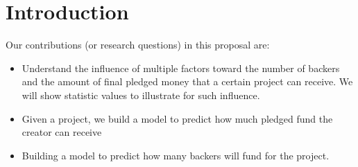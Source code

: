 \section{Introduction}
Our contributions (or research questions) in this proposal are:
\begin{itemize}
\item Understand the influence of multiple factors toward the number of backers and the amount of final pledged money that a certain project can receive. We will show statistic values to illustrate for such influence.
\item Given a project, we build a model to predict how much pledged fund the creator can receive
\item Building a model to predict how many backers will fund for the project.
\end{itemize}